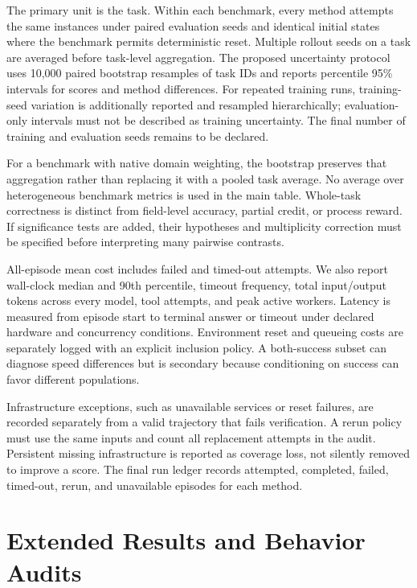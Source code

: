 The primary unit is the task. Within each benchmark, every method attempts the same instances under paired evaluation seeds and identical initial states where the benchmark permits deterministic reset. Multiple rollout seeds on a task are averaged before task-level aggregation. The proposed uncertainty protocol uses 10,000 paired bootstrap resamples of task IDs and reports percentile 95\% intervals for scores and method differences. For repeated training runs, training-seed variation is additionally reported and resampled hierarchically; evaluation-only intervals must not be described as training uncertainty. The final number of training and evaluation seeds remains to be declared.

For a benchmark with native domain weighting, the bootstrap preserves that aggregation rather than replacing it with a pooled task average. No average over heterogeneous benchmark metrics is used in the main table. Whole-task correctness is distinct from field-level accuracy, partial credit, or process reward. If significance tests are added, their hypotheses and multiplicity correction must be specified before interpreting many pairwise contrasts.

All-episode mean cost includes failed and timed-out attempts. We also report wall-clock median and 90th percentile, timeout frequency, total input/output tokens across every model, tool attempts, and peak active workers. Latency is measured from episode start to terminal answer or timeout under declared hardware and concurrency conditions. Environment reset and queueing costs are separately logged with an explicit inclusion policy. A both-success subset can diagnose speed differences but is secondary because conditioning on success can favor different populations.

Infrastructure exceptions, such as unavailable services or reset failures, are recorded separately from a valid trajectory that fails verification. A rerun policy must use the same inputs and count all replacement attempts in the audit. Persistent missing infrastructure is reported as coverage loss, not silently removed to improve a score. The final run ledger records attempted, completed, failed, timed-out, rerun, and unavailable episodes for each method.

\section{Extended Results and Behavior Audits}
\label{app:extended-results}

